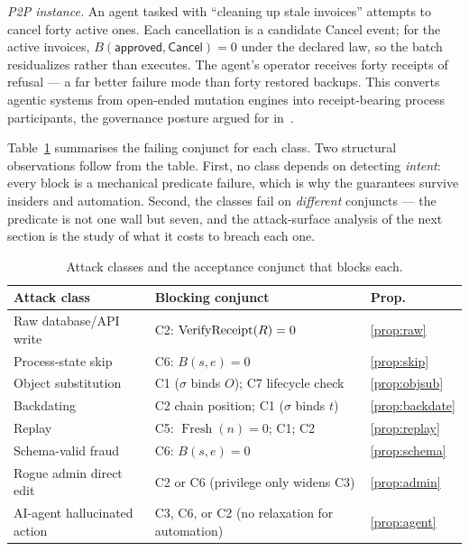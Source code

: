 \emph{P2P instance.} An agent tasked with ``cleaning up stale invoices''
attempts to cancel forty active ones. Each cancellation is a candidate
\textsf{Cancel} event; for the active invoices, $B(\textsf{approved},
\textsf{Cancel}) = 0$ under the declared law, so the batch residualizes
rather than executes. The agent's operator receives forty receipts of refusal
--- a far better failure mode than forty restored backups. This converts
agentic systems from open-ended mutation engines into receipt-bearing process
participants, the governance posture argued for
in~\cite{van_der_aalst_no_ai_without_pi_2024,nist_ai_rmf_maturity_2024}.

\medskip

Table~\ref{tab:inaccessibility} summarises the failing conjunct for each
class. Two structural observations follow from the table. First, no class
depends on detecting \emph{intent}: every block is a mechanical predicate
failure, which is why the guarantees survive insiders and automation. Second,
the classes fail on \emph{different} conjuncts --- the predicate is not one
wall but seven, and the attack-surface analysis of the next section is the
study of what it costs to breach each one.

\begin{table}[t]
\centering
\caption{Attack classes and the acceptance conjunct that blocks each.}
\label{tab:inaccessibility}
\begin{tabularx}{\textwidth}{lXl}
\toprule
\textbf{Attack class} & \textbf{Blocking conjunct} & \textbf{Prop.}\\
\midrule
Raw database/API write       & C2: $\operatorname{VerifyReceipt}(R) = 0$                       & \ref{prop:raw}\\
Process-state skip           & C6: $B(s,e) = 0$                                  & \ref{prop:skip}\\
Object substitution          & C1 ($\sigma$ binds $O$); C7 lifecycle check        & \ref{prop:objsub}\\
Backdating                   & C2 chain position; C1 ($\sigma$ binds $t$)         & \ref{prop:backdate}\\
Replay                       & C5: $\operatorname{Fresh}(n)=0$; C1; C2            & \ref{prop:replay}\\
Schema-valid fraud           & C6: $B(s,e) = 0$                                  & \ref{prop:schema}\\
Rogue admin direct edit      & C2 or C6 (privilege only widens C3)                & \ref{prop:admin}\\
AI-agent hallucinated action & C3, C6, or C2 (no relaxation for automation)       & \ref{prop:agent}\\
\bottomrule
\end{tabularx}
\end{table}
